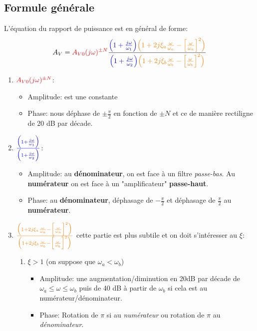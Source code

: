 \documentclass{report}
\begin{document}
\subsection{Formule générale}
L'équation du rapport de puissance est en général de forme:
\begin{equation}
A_V = \textcolor{red}{A_{V0}(j\omega)^{\pm N}}\frac{\textcolor{blue}{\Bigl(1 + \frac{j\omega}{\omega_1}\Bigl)} \textcolor{orange}{\Bigl( 1 + 2 j \xi_a \frac{\omega}{\omega_a} - \Bigl[ \frac{\omega}{\omega_a}\Bigl]^2 \Bigl)}}{\textcolor{blue}{\Bigl(1 + \frac{j\omega}{\omega_2}\Bigl)} \textcolor{orange}{\Bigl( 1 + 2 j \xi_b \frac{\omega}{\omega_b} - \Bigl[ \frac{\omega}{\omega_b}\Bigl]^2 \Bigl)}}
\end{equation}
\newpage
\begin{enumerate}
\item $\textcolor{red}{A_{V0}(j\omega)^{\pm N}}$:
	\begin{itemize}
	\item Amplitude: est une constante
	\item Phase: nous déphase de $\pm \frac{\pi}{2}$ en fonction de $\pm N$ et ce de manière rectiligne de 20 dB par décade.
	\end{itemize}
\item $\textcolor{blue}{\frac{\textcolor{blue}{\Bigl(1 + \frac{j\omega}{\omega_1}\Bigl)}}{\textcolor{blue}{\Bigl(1 + \frac{j\omega}{\omega_2}\Bigl)}}}$:
	\begin{itemize}
	\item Amplitude: au \textbf{dénominateur}, on est face à un filtre \textit{passe-bas}. Au \textbf{numérateur} on est face à un "amplificateur" \textbf{passe-haut}.
	\item Phase: au \textbf{dénominateur}, déphasage de $-\frac{\pi}{2}$ et déphasage de $\frac{\pi}{2}$ au \textbf{numérateur}.
	\end{itemize}
\item $\textcolor{orange}{\frac{\textcolor{orange}{\Bigl( 1 + 2 j \xi_a \frac{\omega}{\omega_a} - \Bigl[ \frac{\omega}{\omega_a}\Bigl]^2 \Bigl)}}{\textcolor{orange}{\Bigl( 1 + 2 j \xi_b \frac{\omega}{\omega_b} - \Bigl[ \frac{\omega}{\omega_b}\Bigl]^2 \Bigl)}}}$ cette partie est plus subtile et on doit s'intéresser au $\xi$:
	\begin{enumerate}
		\item $\xi >  1$ (on suppose que $\omega_a < \omega_b$)
		\begin{itemize}
			\item Amplitude: une augmentation/diminution en 20dB par décade de $\omega_a \leq \omega \leq \omega_b$ puis de 40 dB à partir de $\omega_b$ si cela est au numérateur/dénominateur.
			\item Phase: Rotation de $\pi$ si au \textit{numérateur} ou rotation de $\pi$ au \textit{dénominateur}.
		\end{itemize}
		

\end{enumerate}
\end{enumerate}
\end{document}
